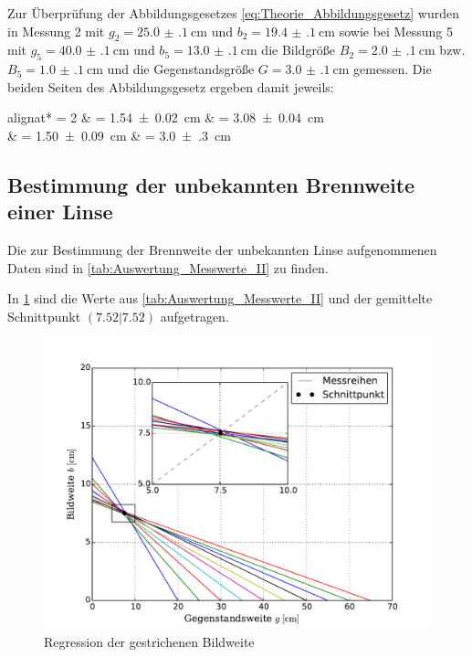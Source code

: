 	 Zur Überprüfung der Abbildungsgesetzes \cref{eq:Theorie_Abbildungsgesetz} wurden in 
	 Messung 2 mit $g_{2} = \SI{25.0(1)}{\cm}$ und $b_{2} = \SI{19.4(1)}{\cm}$ sowie
	 bei Messung 5 mit $g_{5} = \SI{40.0(1)}{\cm}$ und $b_{5} = \SI{13.0(1)}{\cm}$
	 die Bildgröße $B_{2} = \SI{2.0(1)}{\cm}$ bzw. $B_{5} = \SI{1.0(1)}{\cm}$ und 
	 die Gegenstandsgröße $G = \SI{3.0(1)}{\centi\meter}$ gemessen.
	 Die beiden Seiten des Abbildungsgesetz ergeben damit jeweils:
	 \begin{empheq}{alignat* = 2}
	 	& = \SI{1.54(2)}{\cm} \qquad	& = \SI{3.08(4)}{\cm}\\  
	 	& = \SI{1.50(9)}{\cm}	\qquad     & = \SI{3.0(3)}{\cm}
	 \end{empheq}
	 
	 
	  
\subsection{Bestimmung der unbekannten Brennweite einer Linse}
	
	Die zur Bestimmung der Brennweite der unbekannten Linse aufgenommenen Daten sind in 
	\cref{tab:Auswertung_Messwerte_II} zu finden.
	
	 
	
	In \cref{fig:Auswertung_UnbekannteLinse} sind die Werte aus \cref{tab:Auswertung_Messwerte_II} und der gemittelte Schnittpunkt
	$(7.52|7.52)$ aufgetragen.
	
	\begin{figure}[!h]
		\centering
		\includegraphics[scale=.7]{Grafiken/Messwerte_Unbekannt.pdf}
		\caption{Regression der gestrichenen Bildweite \label{fig:Auswertung_UnbekannteLinse}}
	\end{figure}  
	
